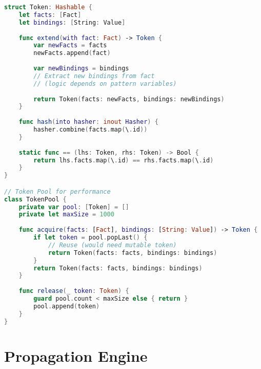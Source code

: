 \begin{lstlisting}[language=Swift]
struct Token: Hashable {
    let facts: [Fact]
    let bindings: [String: Value]
    
    func extend(with fact: Fact) -> Token {
        var newFacts = facts
        newFacts.append(fact)
        
        var newBindings = bindings
        // Extract new bindings from fact
        // (logic depends on pattern variables)
        
        return Token(facts: newFacts, bindings: newBindings)
    }
    
    func hash(into hasher: inout Hasher) {
        hasher.combine(facts.map(\.id))
    }
    
    static func == (lhs: Token, rhs: Token) -> Bool {
        return lhs.facts.map(\.id) == rhs.facts.map(\.id)
    }
}

// Token Pool for performance
class TokenPool {
    private var pool: [Token] = []
    private let maxSize = 1000
    
    func acquire(facts: [Fact], bindings: [String: Value]) -> Token {
        if let token = pool.popLast() {
            // Reuse (would need mutable token)
            return Token(facts: facts, bindings: bindings)
        }
        return Token(facts: facts, bindings: bindings)
    }
    
    func release(_ token: Token) {
        guard pool.count < maxSize else { return }
        pool.append(token)
    }
}
\end{lstlisting}

\section{Propagation Engine}

